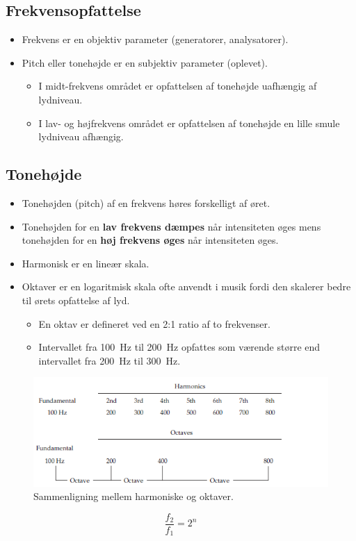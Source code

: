 \subsection{Frekvensopfattelse}
\begin{itemize}
	\item Frekvens er en objektiv parameter (generatorer, analysatorer).
	\item Pitch eller tonehøjde er en subjektiv parameter (oplevet).
	\begin{itemize}
		\item I midt-frekvens området er opfattelsen af	tonehøjde uafhængig af lydniveau.
		\item I lav- og højfrekvens området er opfattelsen af tonehøjde en lille smule lydniveau afhængig.
	\end{itemize}
\end{itemize}

\subsection{Tonehøjde}
\begin{itemize}
	\item Tonehøjden (pitch) af en frekvens høres forskelligt af øret.
	\item Tonehøjden for en \textbf{lav frekvens dæmpes} når intensiteten øges mens tonehøjden for en \textbf{høj frekvens øges} når intensiteten øges.
	\item Harmonisk er en lineær skala.
	\item Oktaver er en logaritmisk skala ofte anvendt i musik fordi den skalerer bedre til ørets opfattelse af lyd. 
	\begin{itemize}
		\item En oktav er defineret ved en 2:1 ratio af to frekvenser. 
		\item Intervallet fra \SI{100}{\hertz} til \SI{200}{\hertz} opfattes som værende større end intervallet fra \SI{200}{\hertz} til \SI{300}{\hertz}. 
	\end{itemize}
\end{itemize}

\begin{figure} [H]
	\centering
	\includegraphics[width=\linewidth]{graphics/3.png}
	\caption{Sammenligning mellem harmoniske og oktaver. }
	\label{fig:3}
\end{figure}
\newpage
\begin{equation}\label{eq:octave}
\frac{f_2}{f_1} = 2^n
\end{equation}

